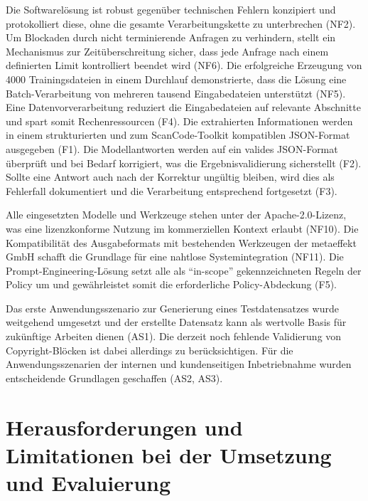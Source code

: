 Die Softwarelösung ist robust gegenüber technischen Fehlern konzipiert und protokolliert diese, ohne die gesamte Verarbeitungskette zu unterbrechen (NF2).
Um Blockaden durch nicht terminierende Anfragen zu verhindern, stellt ein Mechanismus zur Zeitüberschreitung sicher, dass jede Anfrage nach einem definierten Limit kontrolliert beendet wird (NF6).
Die erfolgreiche Erzeugung von \num{4000} Trainingsdateien in einem Durchlauf demonstrierte, dass die Lösung eine Batch-Verarbeitung von mehreren tausend Eingabedateien unterstützt (NF5).
Eine Datenvorverarbeitung reduziert die Eingabedateien auf relevante Abschnitte und spart somit Rechenressourcen (F4).
Die extrahierten Informationen werden in einem strukturierten und zum ScanCode-Toolkit kompatiblen JSON-Format ausgegeben (F1).
Die Modellantworten werden auf ein valides JSON-Format überprüft und bei Bedarf korrigiert, was die Ergebnisvalidierung sicherstellt (F2).
Sollte eine Antwort auch nach der Korrektur ungültig bleiben, wird dies als Fehlerfall dokumentiert und die Verarbeitung entsprechend fortgesetzt (F3).

Alle eingesetzten Modelle und Werkzeuge stehen unter der Apache-2.0-Lizenz, was eine lizenzkonforme Nutzung im kommerziellen Kontext erlaubt (NF10).
Die Kompatibilität des Ausgabeformats mit bestehenden Werkzeugen der metaeffekt GmbH schafft die Grundlage für eine nahtlose Systemintegration (NF11).
Die Prompt-Engineering-Lösung setzt alle als \enquote{in-scope} gekennzeichneten Regeln der Policy um und gewährleistet somit die erforderliche Policy-Abdeckung (F5).

Das erste Anwendungsszenario zur Generierung eines Testdatensatzes wurde weitgehend umgesetzt und der erstellte Datensatz kann als wertvolle Basis für zukünftige Arbeiten dienen (AS1).
Die derzeit noch fehlende Validierung von Copyright-Blöcken ist dabei allerdings zu berücksichtigen.
Für die Anwendungsszenarien der internen und kundenseitigen Inbetriebnahme wurden entscheidende Grundlagen geschaffen (AS2, AS3).



\section{Herausforderungen und Limitationen bei der Umsetzung und Evaluierung}

